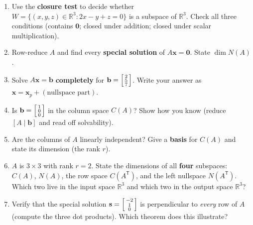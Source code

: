 \documentclass[10pt]{article}
\newcommand{\bb}{\mathbf{b}}
\newcommand{\xx}{\mathbf{x}}
\newcommand{\zero}{\mathbf{0}}
\newcommand{\svec}{\mathbf{s}}
\newcommand{\T}{^{\mathsf T}}
\begin{document}
\begin{enumerate}[leftmargin=1.9em, itemsep=13pt]
  \item Use the \textbf{closure test} to decide whether $W=\{(x,y,z)\in\mathbb{R}^3 : 2x-y+z=0\}$ is a
        subspace of $\mathbb{R}^3$. Check all three conditions (contains $\zero$; closed under addition;
        closed under scalar multiplication).
        \vspace{2.4cm}
  \item Row-reduce $A$ and find every \textbf{special solution} of $A\xx=\zero$. State $\dim N(A)$.
        \vspace{2.6cm}
  \item Solve $A\xx=\bb$ \textbf{completely} for $\bb=\begin{bsmallmatrix}2\\5\\7\end{bsmallmatrix}$.
        Write your answer as $\xx=\xx_p+(\text{nullspace part})$.
        \vspace{2.4cm}
  \item Is $\bb=\begin{bsmallmatrix}1\\0\\0\end{bsmallmatrix}$ in the column space $C(A)$? Show how you
        know (reduce $[A\mid\bb]$ and read off solvability).
        \vspace{2.4cm}
  \item Are the columns of $A$ linearly independent? Give a \textbf{basis} for $C(A)$ and state its
        dimension (the rank $r$).
        \vspace{2.2cm}
  \item $A$ is $3\times3$ with rank $r=2$. State the dimensions of all \textbf{four} subspaces:
        $C(A)$, $N(A)$, the row space $C(A\T)$, and the left nullspace $N(A\T)$. Which two live in the
        input space $\mathbb{R}^3$ and which two in the output space $\mathbb{R}^3$?
        \vspace{2.4cm}
  \item Verify that the special solution $\svec=\begin{bsmallmatrix}-2\\1\\0\end{bsmallmatrix}$ is
        perpendicular to \emph{every} row of $A$ (compute the three dot products). Which theorem does
        this illustrate?
        \vspace{2.2cm}
\end{enumerate}
\end{document}
